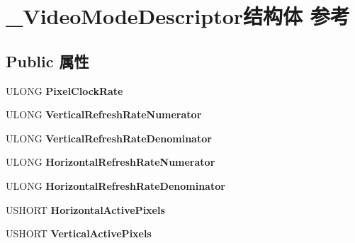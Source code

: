 \hypertarget{struct___video_mode_descriptor}{}\section{\+\_\+\+Video\+Mode\+Descriptor结构体 参考}
\label{struct___video_mode_descriptor}
\subsection*{Public 属性}
\begin{DoxyCompactItemize}
\item 
\mbox{\label{struct___video_mode_descriptor_ac84852d15de6259d49071e9c43410f2c}} 
U\+L\+O\+NG {\bfseries Pixel\+Clock\+Rate}
\item 
\mbox{\label{struct___video_mode_descriptor_a96b88a0a1d8bb1a15fa0c0edffa2aad7}} 
U\+L\+O\+NG {\bfseries Vertical\+Refresh\+Rate\+Numerator}
\item 
\mbox{\label{struct___video_mode_descriptor_ac67d133f79e9c44115914934fb08a223}} 
U\+L\+O\+NG {\bfseries Vertical\+Refresh\+Rate\+Denominator}
\item 
\mbox{\label{struct___video_mode_descriptor_ad9939243e88c9660a410aba739f0f638}} 
U\+L\+O\+NG {\bfseries Horizontal\+Refresh\+Rate\+Numerator}
\item 
\mbox{\label{struct___video_mode_descriptor_ae849dccadc460b6ae7b6aa4717a3d398}} 
U\+L\+O\+NG {\bfseries Horizontal\+Refresh\+Rate\+Denominator}
\item 
\mbox{\label{struct___video_mode_descriptor_a893021a0f5a1fb256c1fde672b539474}} 
U\+S\+H\+O\+RT {\bfseries Horizontal\+Active\+Pixels}
\item 
\mbox{\label{struct___video_mode_descriptor_ac8424ef9f0aa3bda45699469fd2364e2}} 
U\+S\+H\+O\+RT {\bfseries Vertical\+Active\+Pixels}
\item 
\mbox{\label{struct___video_mode_descriptor_a28ad7868ac4b186b98fb607c82d6133c}} 

\end{DoxyCompactItemize}
